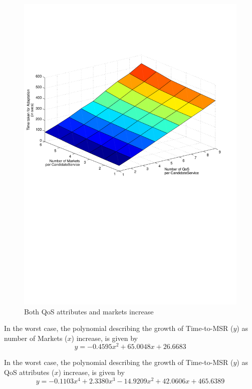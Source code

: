 \documentclass[10pt,journal,compsoc]{IEEEtran}
\begin{document}
\begin{figure}[htbp]
	\centering
	\includegraphics[clip, trim=0cm 12cm 2cm 5cm, scale=0.4]{graphs/scaling_time_qos_mkts.pdf}
	\caption{Both QoS attributes and markets increase \label{fig:qos_and_mkts_scaling}}
\end{figure}

In the worst case, the polynomial describing the growth of Time-to-MSR ($y$) as number of Markets ($x$) increase, is given by
\begin{equation}
    y = -0.4595x^{2} +  65.0048x +  26.6683 \label{eq:mkt_vs_qos}
\end{equation}

In the worst case, the polynomial describing the growth of Time-to-MSR ($y$) as QoS attributes ($x$) increase, is given by
\begin{equation}
    y =  -0.1103x^{4} +   2.3380x^{3} - 14.9209x^{2} +  42.0606x + 465.6389 \label{eq:qos_vs_mkt}
\end{equation}
\end{document}
